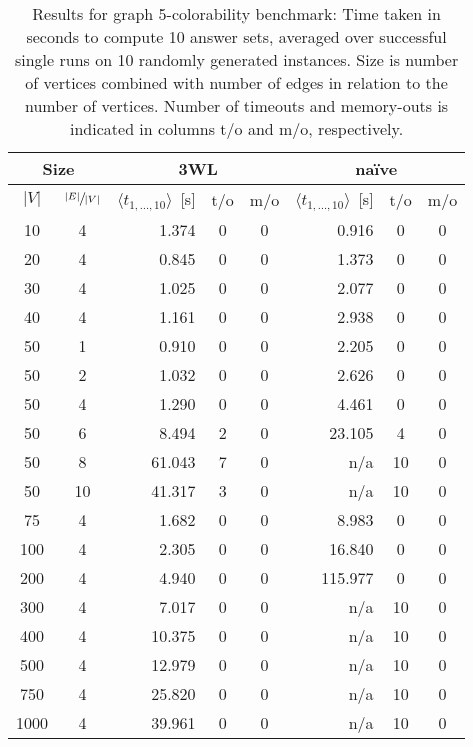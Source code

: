 \documentclass[final]{vutinfth} %
\begin{document}
\begin{table}
\begin{center}
	\begin{tabular}{|cc||rcc|rcc|}
\hline
\multicolumn{2}{|c||}{Size} & \multicolumn{3}{c|}{3WL} & \multicolumn{3}{c|}{na\"{i}ve} \\
\hline
$|V|$ & $\sfrac{|E|}{|V|}$& $\langle t_{1, \ldots, 10} \rangle$~[s]&t/o&m/o& $\langle t_{1, \ldots, 10} \rangle$~[s]&t/o&m/o\\
\hline
\hline
  10 &   4 & 	  1.374 & 0 & 0 &	  0.916 &  0 & 0 \\
  20 &   4 & 	  0.845 & 0 & 0 &	  1.373 &  0 & 0 \\
  30 &   4 & 	  1.025 & 0 & 0 &	  2.077 &  0 & 0 \\
  40 &   4 & 	  1.161 & 0 & 0 &	  2.938 &  0 & 0 \\
  50 &   1 & 	  0.910 & 0 & 0 &	  2.205 &  0 & 0 \\
  50 &   2 & 	  1.032 & 0 & 0 &	  2.626 &  0 & 0 \\
  50 &   4 & 	  1.290 & 0 & 0 &	  4.461 &  0 & 0 \\
  50 &   6 & 	  8.494 & 2 & 0 &	 23.105 &  4 & 0 \\
  50 &   8 & 	 61.043 & 7 & 0 &	    n/a & 10 & 0 \\
  50 &  10 & 	 41.317 & 3 & 0 &	    n/a & 10 & 0 \\
  75 &   4 & 	  1.682 & 0 & 0 &	  8.983 &  0 & 0 \\
 100 &   4 & 	  2.305 & 0 & 0 &	 16.840 &  0 & 0 \\
 200 &   4 & 	  4.940 & 0 & 0 &	115.977 &  0 & 0 \\
 300 &   4 & 	  7.017 & 0 & 0 &	    n/a & 10 & 0 \\
 400 &   4 & 	 10.375 & 0 & 0 &	    n/a & 10 & 0 \\
 500 &   4 & 	 12.979 & 0 & 0 &	    n/a & 10 & 0 \\
 750 &   4 & 	 25.820 & 0 & 0 &	    n/a & 10 & 0 \\
1000 &   4 & 	 39.961 & 0 & 0 &	    n/a & 10 & 0 \\
\hline
	\end{tabular}
	\end{center}
	\caption[Results for graph 5-colorability benchmark]{Results for graph 5-colorability benchmark: Time taken in seconds to compute 10 answer sets, averaged over successful single runs on 10 randomly generated instances. Size is number of vertices combined with number of edges in relation to the number of vertices. Number of timeouts and memory-outs is indicated in columns t/o and m/o, respectively.}
	\label{tbl:5col}
\end{table}
\end{document}
